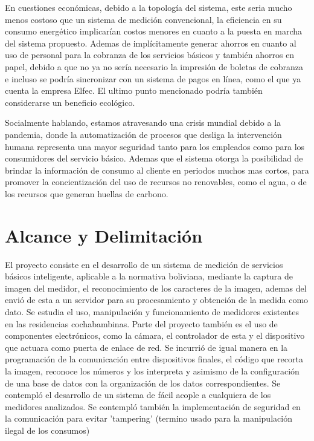 En cuestiones económicas, debido a la topología del sistema, este seria mucho menos costoso que un sistema de medición
convencional, la eficiencia en su consumo energético implicarían costos menores en cuanto a la puesta en marcha del
sistema propuesto. Ademas de implícitamente generar ahorros en cuanto al uso de personal para la cobranza de los servicios
básicos y también ahorros en papel, debido a que no ya no sería necesario la impresión de boletas de cobranza e incluso
se podría sincronizar con un sistema de pagos en línea, como el que ya cuenta la empresa Elfec. El ultimo punto mencionado
podría también considerarse un beneficio ecológico.

Socialmente hablando, estamos atravesando una crisis mundial debido a la pandemia, donde la automatización de procesos
que desliga la intervención humana representa una mayor seguridad tanto para los empleados como para los consumidores del
servicio básico. Ademas que el sistema otorga la posibilidad de brindar la información de consumo al cliente en periodos
muchos mas cortos, para promover la concientización del uso de recursos no renovables, como el agua, o de los recursos
que generan huellas de carbono.

\section{Alcance y Delimitación}
El proyecto consiste en el desarrollo de un sistema de medición de servicios básicos
inteligente, aplicable a la normativa boliviana, mediante la captura de imagen del medidor,
el reconocimiento de los caracteres de la imagen, ademas del envió de esta a un servidor
para su procesamiento y obtención de la medida como dato. Se estudia el uso, manipulación y 
funcionamiento de medidores existentes en las residencias cochabambinas. Parte del proyecto 
también es el uso de componentes electrónicos, como la cámara, el controlador de esta y
el dispositivo que actuara como puerta de enlace de red. Se incurrió de igual manera en
la programación de la comunicación entre dispositivos finales, el código que recorta la
imagen, reconoce los números y los interpreta y asimismo de la configuración de una base 
de datos con la organización de los datos correspondientes. Se contempló el desarrollo de 
un sistema de fácil acople a cualquiera de los medidores analizados.\linebreak
Se contempló también la implementación de seguridad en la comunicación para evitar
'tampering' (termino usado para la manipulación ilegal de los consumos)

